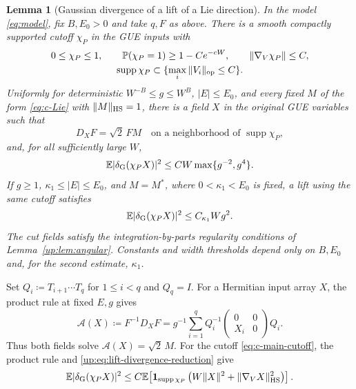 \documentclass[11pt]{article}
\numberwithin{equation}{section}
\newtheorem{lemma}[theorem]{Lemma}
\theoremstyle{remark}
\newcommand{\E}{\mathbb E}
\newcommand{\Prob}{\mathbb P}
\newcommand{\supp}{\operatorname{supp}}
\begin{document}
\begin{lemma}[Gaussian divergence of a lift of a Lie direction]
\label{lem:c-gaussian-lift}
In the model \eqref{eq:model}, fix $B,E_0>0$ and take $q,F$ as above.
There is a smooth compactly supported cutoff $\chi_P$ in the GUE inputs with
\begin{equation}\label{eq:c-main-cutoff}
 \begin{gathered}
 0\le\chi_P\le1,\qquad \Prob(\chi_P=1)\ge1-Ce^{-cW},\qquad
 \|\nabla_V\chi_P\|\le C,\\
 \supp\chi_P\subset\{\max_i\|V_i\|_{\rm op}\le C\}.
 \end{gathered}
\end{equation}
Uniformly for deterministic
$W^{-B}\le g\le W^B$, $|E|\le E_0$, and every fixed $M$ of the form
\eqref{eq:c-Lie} with $\|M\|_{\rm HS}=1$, there is a field
$X$ in the original GUE variables such that
\[
 D_XF=\sqrt2\,FM\quad\text{on a neighborhood of }\supp\chi_P,
\]
and, for all sufficiently large $W$,
\begin{equation}\label{eq:c-gaussian-general}
 \E|\delta_{\rm G}(\chi_P X)|^2
 \le CW\max\{g^{-2},g^4\}.
\end{equation}
If $g\ge1$, $\kappa_1\le|E|\le E_0$, and $M=M^*$, where
$0<\kappa_1<E_0$ is fixed, a lift using the same cutoff satisfies
\begin{equation}\label{eq:c-gaussian-away}
 \E|\delta_{\rm G}(\chi_P X)|^2
 \le C_{\kappa_1}Wg^2.
\end{equation}
The cut fields satisfy the integration-by-parts regularity conditions
of Lemma~\ref{up:lem:angular}. Constants and width thresholds depend
only on $B,E_0$ and, for the second estimate, $\kappa_1$.
\end{lemma}

Set $Q_i\coloneqq T_{i+1}\cdots T_q$ for $1\le i<q$ and $Q_q=I$.
For a Hermitian input array $X$, the product rule at fixed $E,g$ gives
\begin{equation}\label{eq:c-product-map}
 \mathcal A(X)\coloneqq F^{-1}D_XF
 =g^{-1}\sum_{i=1}^qQ_i^{-1}
 \begin{pmatrix}0&0\\X_i&0\end{pmatrix}Q_i.
\end{equation}
Thus both fields solve $\mathcal A(X)=\sqrt2\,M$. For the cutoff
\eqref{eq:c-main-cutoff}, the product rule and
\eqref{up:eq:lift-divergence-reduction} give
\begin{equation}\label{eq:c-input-divergence}
 \E|\delta_{\rm G}(\chi_P X)|^2
 \le C\E\!\left[\mathbf1_{\supp\chi_P}
       \left(W\|X\|^2+\|\nabla_VX\|_{\rm HS}^2\right)\right].
\end{equation}
\end{document}
